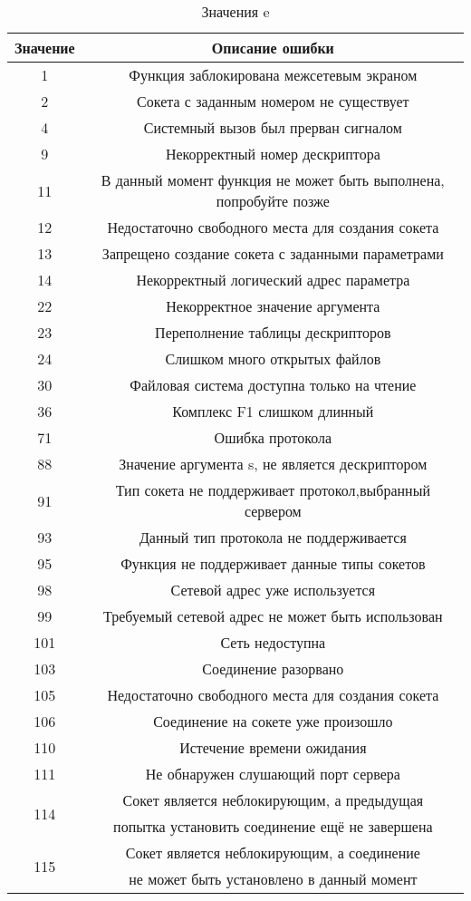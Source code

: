 \documentclass[12t,english,russian]{article}
\begin{document}
\begin{center}
\begin{longtable}{|c|c|}
\caption{\label{error}Значения e}
\\ \hline
Значение & Описание ошибки \\
\hline
1 & Функция заблокирована межсетевым экраном\\
2 & Сокета с заданным номером не существует\\
4 & Системный вызов был прерван сигналом\\
9 & Некорректный номер дескриптора\\
11 & В данный момент функция не может быть выполнена, попробуйте позже\\
12 & Недостаточно свободного места для создания сокета \\
13 & Запрещено создание сокета с заданными параметрами \\
14 & Некорректный логический адрес параметра\\
22 & Некорректное значение аргумента\\
23 & Переполнение таблицы дескрипторов\\
24 & Слишком много открытых файлов\\
30 & Файловая система доступна только на чтение\\
36 & Комплекс F1 слишком длинный\\
71 & Ошибка протокола\\
88 & Значение аргумента s, не является дескриптором\\
91 & Тип сокета не поддерживает протокол,выбранный сервером\\
93 & Данный тип протокола не поддерживается\\
95 & Функция не поддерживает данные типы сокетов\\
98 & Сетевой адрес уже используется\\
99 & Требуемый сетевой адрес не может быть использован\\
101 & Сеть недоступна\\
103 & Соединение разорвано\\
105 & Недостаточно свободного места для создания сокета\\
106 & Соединение на сокете уже произошло\\
110 & Истечение времени ожидания\\
111 & Не обнаружен слушающий порт сервера\\
\multirow{2}{*}{114} & Сокет является неблокирующим, а предыдущая\\
& попытка установить соединение ещё не завершена\\
\multirow{2}{*}{115} & Сокет является неблокирующим, а соединение\\
& не может быть установлено в данный момент\\
\hline
\end{longtable}
\end{center}
\newpage
\end{document}
